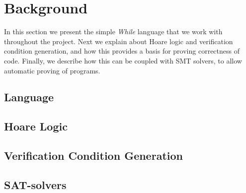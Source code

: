 \section{Background}\label{sec:Background}
In this section we present the simple \textit{While} language that we work with throughout the project.
Next we explain about Hoare logic and verification condition generation, and how this provides a basis for proving correctness of code.
Finally, we describe how this can be coupled with SMT solvers, to allow automatic proving of programs.

\subsection{Language}\label{sec:Language}


\subsection{Hoare Logic}\label{sec:hoare}


\subsection{Verification Condition Generation}\label{sec:vcg}


\subsection{SAT-solvers}

